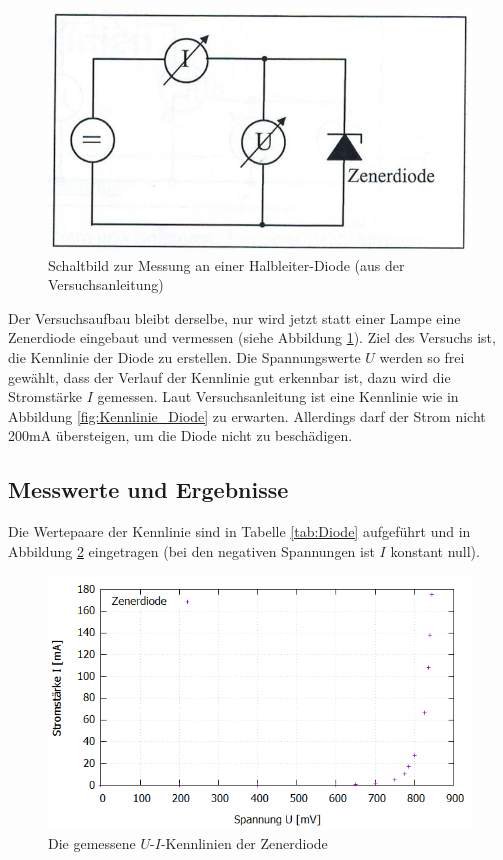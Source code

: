 \documentclass{scrartcl}
\begin{document}
\begin{figure}[H]
  \centering
    \includegraphics[scale=0.75]{Aufbau2.JPG}
  \caption{Schaltbild zur Messung an einer Halbleiter-Diode (aus der Versuchsanleitung)}
  \label{fig:Aufbau2}
\end{figure}

Der Versuchsaufbau bleibt derselbe, nur wird jetzt statt einer Lampe eine Zenerdiode eingebaut und vermessen (siehe Abbildung \ref{fig:Aufbau2}). Ziel des Versuchs ist, die Kennlinie der Diode zu erstellen. Die Spannungswerte $U$ werden so frei gewählt, dass der Verlauf der Kennlinie gut erkennbar ist, dazu wird die Stromstärke $I$ gemessen. Laut Versuchsanleitung ist eine Kennlinie wie in Abbildung \ref{fig:Kennlinie_Diode} zu erwarten. Allerdings darf der Strom nicht 200mA übersteigen, um die Diode nicht zu beschädigen.
\subsection{Messwerte und Ergebnisse}
Die Wertepaare der Kennlinie sind in Tabelle \ref{tab:Diode} aufgeführt und in Abbildung \ref{fig:V2_Kennlinie} eingetragen (bei den negativen Spannungen ist $I$ konstant null).

\begin{figure}[H]
  \centering
    \includegraphics[scale=0.5]{V2_Kennlinie.PNG}
  \caption{Die gemessene $U$-$I$-Kennlinien der Zenerdiode}
  \label{fig:V2_Kennlinie}
\end{figure}
\end{document}
